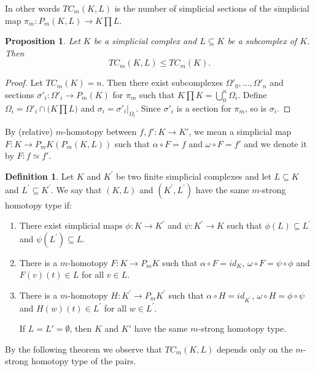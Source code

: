 \documentclass[preprint,11pt %
]{hjm1}
\newtheorem{proposition}[theorem]{Proposition}
\theoremstyle{definition}
\newtheorem{definition}[theorem]{Definition}
\begin{document}
In other words $TC_m(K,L)$ is the number of simplicial sections of the simplicial map $\pi_m :P_m(K,L) \to K \prod L$.



\begin{proposition}
Let $K$ be a simplicial complex and $L \subseteq K$ be a subcomplex of $K$. Then 
\[
TC_m(K, L) \le TC_m (K).
\]
\end{proposition}

\begin{proof}
Let $TC_m (K) = n$. Then there exist subcomplexes $\Omega'_0, \ldots, \Omega'_n$ and sections $\sigma'_i: \Omega'_i \to P_m(K)$ for $\pi_m$ such that $K \prod K = \bigcup_0^n \Omega_i$. Define $\Omega_i = \Omega'_i \cap \big( K \prod L\big)$ and $\sigma_i = \sigma'_i |_{\Omega_i}$. Since $\sigma'_i$ is a section for $\pi_m$,  so is $\sigma_i$.
\end{proof}



By (relative) $m$-homotopy between $f, f': K \to K'$, we mean a simplicial map $F: K \to P_m K (P_m (K, L))$ such that $\alpha \circ F = f$ and $\omega \circ F = f'$  and we denote it  by $F: f \simeq f'$. 



\begin{definition}%
Let $K$ and $K^{'}$ be two finite simplicial complexes and let $L\subseteq K$ and $L^{'}\subseteq K^{'}$. We say that $(K,L)$ and $(K^{'},L^{'})$ have the same $m$-strong homotopy type if:
\begin{enumerate}
\item[(i)]
There exist simplicial maps $\phi :K\to K^{'}$ and $\psi :K^{'}\to K $ such that $\phi (L)\subseteq L^{'}$ and $\psi (L^{'})\subseteq L$.
\item[(ii)]
There is a $m$-homotopy $F:K\to P_m K$ such that $\alpha \circ F=id_K$, $\omega \circ F=\psi \circ \phi $ and $F(v)(t)\in L$ for all $v\in L$.
\item[(iii)]
There is a $m$-homotopy $H:K^{'}\to P_m K^{'}$ such that $\alpha \circ H =id_{K^{'}}$, $\omega \circ H=\phi \circ \psi $ and $H(w)(t)\in L^{'}$ for all $w\in L^{'}$. 

If $L = L' = \emptyset$, then $K$ and $K'$ have the same $m$-strong homotopy type.
\end{enumerate}

\end{definition}
By the following theorem we observe that $TC_m(K,L)$ depends only on the $m$-strong homotopy type of the pairs.
\end{document}
